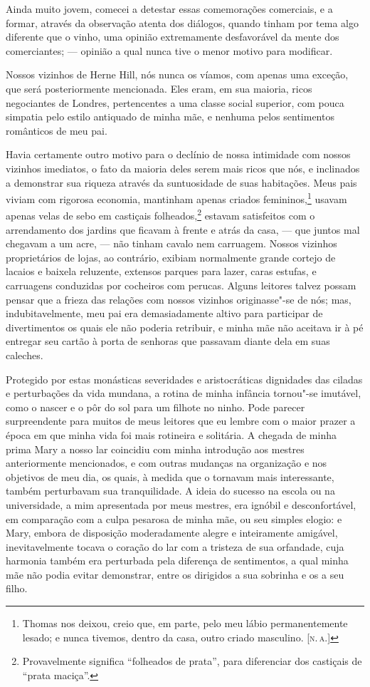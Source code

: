 Ainda muito jovem, comecei a detestar essas comemorações comerciais, e a
formar, através da observação atenta dos diálogos, quando tinham por
tema algo diferente que o vinho, uma opinião extremamente desfavorável
da mente dos comerciantes; --- opinião a qual nunca tive o menor motivo
para modificar.

Nossos vizinhos de Herne Hill, nós nunca os víamos, com apenas uma
exceção, que será posteriormente mencionada. Eles eram, em sua maioria,
ricos negociantes de Londres, pertencentes a uma classe social superior,
com pouca simpatia pelo estilo antiquado de minha mãe, e nenhuma pelos
sentimentos românticos de meu pai.

Havia certamente outro motivo para o declínio de nossa intimidade
com nossos vizinhos imediatos, o fato da maioria deles serem mais ricos
que nós, e inclinados a demonstrar sua riqueza através da suntuosidade
de suas habitações. Meus pais viviam com rigorosa economia, mantinham
apenas criados femininos,\footnote{Thomas nos deixou, creio que, em
  parte, pelo meu lábio permanentemente lesado; e nunca tivemos, dentro
  da casa, outro criado masculino. {[}\textsc{n.\,a.}{]}} usavam apenas velas
de sebo em castiçais folheados,\footnote{Provavelmente significa
  ``folheados de prata'', para diferenciar dos castiçais de ``prata
  maciça''.} estavam satisfeitos com o arrendamento dos
jardins que ficavam à frente e atrás da casa, --- que juntos mal chegavam
a um acre, --- não tinham cavalo nem carruagem. Nossos vizinhos
proprietários de lojas, ao contrário, exibiam normalmente grande cortejo
de lacaios e baixela reluzente, extensos parques para lazer, caras
estufas, e carruagens conduzidas por cocheiros com perucas. Alguns
leitores talvez possam pensar que a frieza das relações com nossos
vizinhos originasse"-se de nós; mas, indubitavelmente, meu pai era
demasiadamente altivo para participar de divertimentos os quais ele não
poderia retribuir, e minha mãe não aceitava ir à pé entregar seu cartão
à porta de senhoras que passavam diante dela em suas caleches.

Protegido por estas monásticas severidades e aristocráticas
dignidades das ciladas e perturbações da vida mundana, a rotina de minha
infância tornou"-se imutável, como o nascer e o pôr do sol para um
filhote no ninho. Pode parecer surpreendente para muitos de meus
leitores que eu lembre com o maior prazer a época em que minha vida foi
mais rotineira e solitária. A chegada de minha prima Mary a nosso lar
coincidiu com minha introdução aos mestres anteriormente mencionados, e
com outras mudanças na organização e nos objetivos de meu dia, os quais,
à medida que o tornavam mais interessante, também perturbavam sua
tranquilidade. A ideia do sucesso na escola ou na universidade, a mim
apresentada por meus mestres, era ignóbil e desconfortável, em
comparação com a culpa pesarosa de minha mãe, ou seu simples elogio: e
Mary, embora de disposição moderadamente alegre e inteiramente amigável,
inevitavelmente tocava o coração do lar com a tristeza de sua orfandade,
cuja harmonia também era perturbada pela diferença de sentimentos, a
qual minha mãe não podia evitar demonstrar, entre os dirigidos a sua
sobrinha e os a seu filho.

